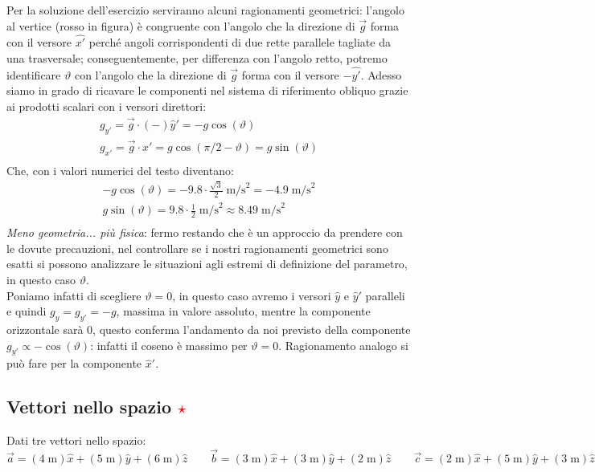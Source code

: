 \documentclass[12pt,a4paper]{book}
\newcommand{\rstar}{ \textcolor{red}{$\star$}}
\begin{document}
Per la soluzione dell'esercizio serviranno alcuni ragionamenti geometrici: l'angolo al vertice (rosso in figura) è congruente con l'angolo che la direzione di $\vec{g}$ forma con il versore $\hat{x'}$ perché angoli corrispondenti di due rette parallele tagliate da una trasversale; conseguentemente, per differenza con l'angolo retto, potremo identificare $\vartheta$ con l'angolo che la direzione di $\vec{g}$ forma con il versore $-\hat{y'}$. Adesso siamo in grado di ricavare le componenti nel sistema di riferimento obliquo grazie ai prodotti scalari con i versori direttori:
%
\begin{gather*}
g_{y'}= \vec{g}\cdot (-)\hat{y}'=-g\cos(\vartheta) \\
g_{x'}= \vec{g}\cdot \hat{x}'=g\cos(\pi/2 - \vartheta)=g\sin(\vartheta) \\
\end{gather*} 
%
Che, con i valori numerici del testo diventano:
%
\begin{gather*}
-g\cos(\vartheta) = -9.8 \cdot \frac{\sqrt{3}}{2}\;\text{m/s}^2=-4.9\;\text{m/s}^2 \\
g\sin(\vartheta) = 9.8 \cdot \frac{1}{2}\;\text{m/s}^2 \approx 8.49\;\text{m/s}^2 \\
\end{gather*} 
%
\textit{Meno geometria... più fisica}: fermo restando che è un approccio da prendere con le dovute precauzioni, nel controllare se i nostri ragionamenti geometrici sono esatti si possono analizzare le situazioni agli estremi di definizione del parametro, in questo caso $\vartheta$. \\
Poniamo infatti di scegliere $\vartheta=0$, in questo caso avremo i versori $\hat{y}$ e $\hat{y}'$ paralleli e quindi $g_y=g_{y'}=-g$, massima in valore assoluto, mentre la componente orizzontale sarà 0, questo conferma l'andamento da noi previsto della componente $g_{y'}\propto - \cos(\vartheta)$: infatti il coseno è massimo per $\vartheta=0$. Ragionamento analogo si può fare per la componente $\hat{x}'$.


\subsection{Vettori nello spazio \rstar}
Dati tre vettori nello spazio:
\begin{equation*}
\vec{a}=(4\;\text{m})\hat{x}+(5\;\text{m})\hat{y}+(6\;\text{m})\hat{z} \qquad \vec{b}=(3\;\text{m})\hat{x}+(3\;\text{m})\hat{y}+(2\;\text{m})\hat{z} \qquad \vec{c}=(2\;\text{m})\hat{x}+(5\;\text{m})\hat{y}+(3\;\text{m})\hat{z}
\end{equation*}
\end{document}
